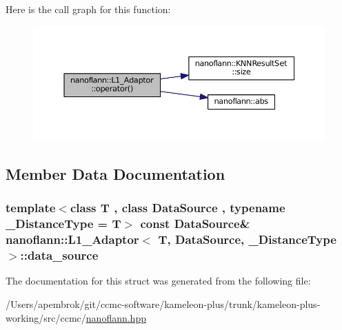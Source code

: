 Here is the call graph for this function\-:\nopagebreak
\begin{figure}[H]
\begin{center}
\leavevmode
\includegraphics[width=350pt]{structnanoflann_1_1_l1___adaptor_a84e509cc50ad2bb6bc3fbe9f073ea4e3_cgraph}
\end{center}
\end{figure}




\subsection{Member Data Documentation}
\hypertarget{structnanoflann_1_1_l1___adaptor_af5ffa8683071c1452a4619cce0a6f707}{
\subsubsection[{data\-\_\-source}]{\setlength{\rightskip}{0pt plus 5cm}template$<$class T , class Data\-Source , typename \-\_\-\-Distance\-Type  = T$>$ const Data\-Source\& {\bf nanoflann\-::\-L1\-\_\-\-Adaptor}$<$ T, Data\-Source, \-\_\-\-Distance\-Type $>$\-::data\-\_\-source}}\label{structnanoflann_1_1_l1___adaptor_af5ffa8683071c1452a4619cce0a6f707}


The documentation for this struct was generated from the following file\-:\begin{DoxyCompactItemize}
\item 
/\-Users/apembrok/git/ccmc-\/software/kameleon-\/plus/trunk/kameleon-\/plus-\/working/src/ccmc/\hyperlink{nanoflann_8hpp}{nanoflann.\-hpp}\end{DoxyCompactItemize}
